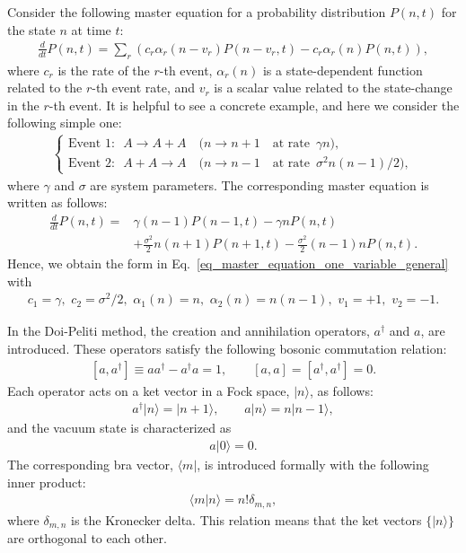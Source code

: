 \documentclass[sn-mathphys,Numbered]{sn-jnl}%
\theoremstyle{thmstyleone}%
\theoremstyle{thmstyletwo}%
\theoremstyle{thmstylethree}%
\begin{document}
Consider the following master equation for a probability distribution $P(n,t)$ for the state $n$ at time $t$:
\begin{align}
\frac{d}{dt} P(n,t)
= \sum_{r} \left( c_r \alpha_r(n-v_r) P(n-v_r,t) - c_r \alpha_r(n) P(n,t) \right),
\label{eq_master_equation_one_variable_general}
\end{align}
where $c_r$ is the rate of the $r$-th event, $\alpha_r(n)$ is a state-dependent function related to the $r$-th event rate, and $v_r$ is a scalar value related to the state-change in the $r$-th event. It is helpful to see a concrete example, and here we consider the following simple one:
\begin{align}
\begin{cases}
\textrm{Event 1: } \,\, A \to A + A \quad  \big( n \to n+1  \quad \textrm{at rate} \,\,\, \gamma n  \big),\\
\textrm{Event 2: } \,\, A + A \to A \quad  \big( n \to n-1  \quad \textrm{at rate} \,\,\, \sigma^2 n (n-1) / 2 \big),
\end{cases}
\label{eq_sFKPP_naive_chemical_reactions}
\end{align}
where $\gamma$ and $\sigma$ are system parameters. The corresponding master equation is written as follows:
\begin{align}
\frac{d}{dt} P(n,t) 
= &\gamma(n-1)P(n-1,t) - \gamma n P(n,t) \nonumber \\
&+ \frac{\sigma^2}{2} n(n+1) P(n+1,t) - \frac{\sigma^2}{2} (n-1)n P(n,t).
\label{eq_sFKPP_naive_master_equation}
\end{align}
Hence, we obtain the form in Eq.~\eqref{eq_master_equation_one_variable_general} with 
\begin{align}
c_1 = \gamma, \,\, c_2 = \sigma^2/2, \,\, 
\alpha_1(n) = n, \,\, \alpha_2(n) = n(n-1), \,\,
v_1 = +1, \,\, v_2 = -1.
\end{align}

In the Doi-Peliti method, the creation and annihilation operators, $a^\dagger$ and $a$, are introduced. These operators satisfy the following bosonic commutation relation:
\begin{align}
\left[a, a^\dagger \right] \equiv a a^\dagger - a^\dagger a = 1, \qquad \left[ a, a \right] = \left[ a^\dagger, a^\dagger \right] = 0.
\end{align}
Each operator acts on a ket vector in a Fock space, $|n\rangle$, as follows:
\begin{align}
a^\dagger | n \rangle = | n+1 \rangle, \qquad a | n \rangle = n | n-1 \rangle,
\label{eq_action_operators_in_Doi_Peliti}
\end{align}
and the vacuum state is characterized as
\begin{align}
a | 0 \rangle = 0.
\end{align}
The corresponding bra vector, $\langle m |$, is introduced formally with the following inner product:
\begin{align}
\langle m | n \rangle = n! \delta_{m,n},
\label{eq_Doi_Peliti_orthogonality}
\end{align}
where $\delta_{m,n}$ is the Kronecker delta. This relation means that the ket vectors $\{| n\rangle\}$ are orthogonal to each other.
\end{document}
